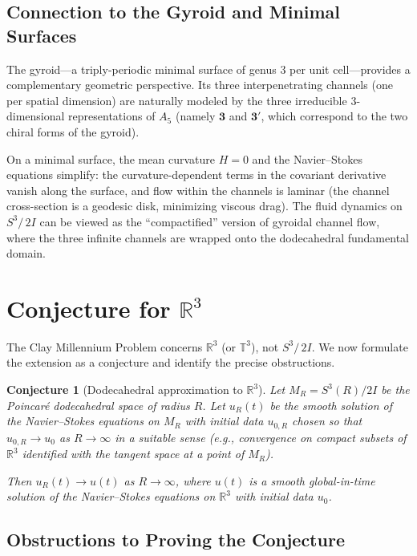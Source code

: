 \documentclass[11pt,a4paper]{article}
\theoremstyle{plain}
\newtheorem{conjecture}[theorem]{Conjecture}
\theoremstyle{definition}
\newcommand{\R}{\mathbb{R}}
\newcommand{\DS}{S^3\!/\,2I}             %
\newcommand{\BI}{2I}                      %
\begin{document}
\subsection{Connection to the Gyroid and Minimal Surfaces}

The gyroid---a triply-periodic minimal surface of genus $3$ per unit
cell---provides a complementary geometric perspective.  Its three
interpenetrating channels (one per spatial dimension) are naturally modeled
by the three irreducible $3$-dimensional representations of $A_5$ (namely
$\mathbf{3}$ and $\mathbf{3}'$, which correspond to the two chiral forms
of the gyroid).

On a minimal surface, the mean curvature $H = 0$ and the Navier--Stokes
equations simplify: the curvature-dependent terms in the covariant derivative
vanish along the surface, and flow within the channels is laminar
(the channel cross-section is a geodesic disk, minimizing viscous drag).
The fluid dynamics on $\DS$ can be viewed as the ``compactified'' version
of gyroidal channel flow, where the three infinite channels are wrapped
onto the dodecahedral fundamental domain.

\section{Conjecture for $\R^3$}\label{sec:R3}

The Clay Millennium Problem concerns $\R^3$ (or $\mathbb{T}^3$), not $\DS$.
We now formulate the extension as a conjecture and identify the precise
obstructions.

\begin{conjecture}[Dodecahedral approximation to $\R^3$]\label{conj:R3}
Let $M_R = S^3(R)/\BI$ be the Poincar\'{e} dodecahedral space of radius $R$.
Let $u_R(t)$ be the smooth solution of the Navier--Stokes equations on $M_R$
with initial data $u_{0,R}$ chosen so that $u_{0,R} \to u_0$ as $R \to
\infty$ in a suitable sense (e.g., convergence on compact subsets of $\R^3$
identified with the tangent space at a point of $M_R$).

Then $u_R(t) \to u(t)$ as $R \to \infty$, where $u(t)$ is a smooth
global-in-time solution of the Navier--Stokes equations on $\R^3$ with
initial data $u_0$.
\end{conjecture}

\subsection{Obstructions to Proving the Conjecture}
\end{document}
